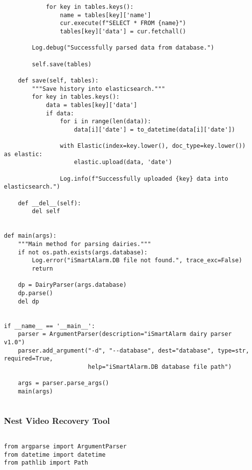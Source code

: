 \documentclass{easychair}
\begin{document}
\begin{enumerate}
\begin{lstlisting}
            for key in tables.keys():
                name = tables[key]['name']
                cur.execute(f"SELECT * FROM {name}")
                tables[key]['data'] = cur.fetchall()

        Log.debug("Successfully parsed data from database.")

        self.save(tables)

    def save(self, tables):
        """Save history into elasticsearch."""
        for key in tables.keys():
            data = tables[key]['data']
            if data:
                for i in range(len(data)):
                    data[i]['date'] = to_datetime(data[i]['date'])

                with Elastic(index=key.lower(), doc_type=key.lower()) as elastic:
                    elastic.upload(data, 'date')
                
                Log.info(f"Successfully uploaded {key} data into elasticsearch.")

    def __del__(self):
        del self


def main(args):
    """Main method for parsing dairies."""
    if not os.path.exists(args.database):
        Log.error("iSmartAlarm.DB file not found.", trace_exc=False)
        return

    dp = DairyParser(args.database)
    dp.parse()
    del dp


if __name__ == '__main__':
    parser = ArgumentParser(description="iSmartAlarm dairy parser v1.0")
    parser.add_argument("-d", "--database", dest="database", type=str, required=True,
                        help="iSmartAlarm.DB database file path")

    args = parser.parse_args()
    main(args)


\end{lstlisting}





\subsubsection{Nest Video Recovery Tool}

\lstset{language=Python}
\lstset{frame=lines}
\lstset{basicstyle=\footnotesize}
\begin{lstlisting}

from argparse import ArgumentParser
from datetime import datetime
from pathlib import Path


\end{lstlisting}
\end{enumerate}
\end{document}
